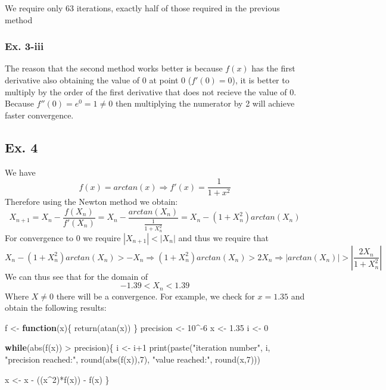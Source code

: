 \documentclass[
]{article}
\newenvironment{Shaded}{\begin{snugshade}}{\end{snugshade}}
\newcommand{\ControlFlowTok}[1]{\textcolor[rgb]{0.13,0.29,0.53}{\textbf{#1}}}
\newcommand{\DecValTok}[1]{\textcolor[rgb]{0.00,0.00,0.81}{#1}}
\newcommand{\FloatTok}[1]{\textcolor[rgb]{0.00,0.00,0.81}{#1}}
\newcommand{\FunctionTok}[1]{\textcolor[rgb]{0.00,0.00,0.00}{#1}}
\newcommand{\NormalTok}[1]{#1}
\newcommand{\OtherTok}[1]{\textcolor[rgb]{0.56,0.35,0.01}{#1}}
\newcommand{\SpecialCharTok}[1]{\textcolor[rgb]{0.00,0.00,0.00}{#1}}
\newcommand{\StringTok}[1]{\textcolor[rgb]{0.31,0.60,0.02}{#1}}
\begin{document}
We require only 63 iterations, exactly half of those required in the
previous method

\hypertarget{ex.-3-iii}{%
\subsubsection{Ex. 3-iii}\label{ex.-3-iii}}

The reason that the second method works better is because \(f(x)\) has
the first derivative also obtaining the value of 0 at point 0
(\(f'(0)=0\)), it is better to multiply by the order of the first
derivative that does not recieve the value of 0. Because
\(f''(0)=e^0=1\ne0\) then multiplying the numerator by 2 will achieve
faster convergence.

\hypertarget{ex.-4}{%
\subsection{Ex. 4}\label{ex.-4}}

We have \[
f(x) = arctan(x) \Rightarrow f'(x) = \frac{1}{1+x^2}
\] Therefore using the Newton method we obtain: \[
X_{n+1} = X_n - \frac{f(X_n)}{f'(X_n)}= X_n - \frac{arctan(X_n)}{\frac{1}{1+X_n^2}} = X_n- (1+X_n^2)arctan(X_n) 
\] For convergence to 0 we require \(|X_{n+1}|<|X_{n}|\) and thus we
require that \[
X_n- (1+X_n^2)arctan(X_n) > -X_n\Longrightarrow (1+X_n^2)arctan(X_n) > 2X_n \Longrightarrow |arctan(X_n)| > |\frac{2X_n}{1+X_n^2}|
\] We can thus see that for the domain of \[
-1.39<X_n<1.39
\] Where \(X\ne0\) there will be a convergence. For example, we check
for \(x=1.35\) and obtain the following results:

\begin{Shaded}
\begin{Highlighting}[]
\NormalTok{f }\OtherTok{\textless{}{-}} \ControlFlowTok{function}\NormalTok{(x)\{}
  \FunctionTok{return}\NormalTok{(}\FunctionTok{atan}\NormalTok{(x))}
\NormalTok{\}}
\NormalTok{precision }\OtherTok{\textless{}{-}} \DecValTok{10}\SpecialCharTok{\^{}{-}}\DecValTok{6}
\NormalTok{x }\OtherTok{\textless{}{-}} \FloatTok{1.35}
\NormalTok{i }\OtherTok{\textless{}{-}} \DecValTok{0}

\ControlFlowTok{while}\NormalTok{(}\FunctionTok{abs}\NormalTok{(}\FunctionTok{f}\NormalTok{(x)) }\SpecialCharTok{\textgreater{}}\NormalTok{ precision)\{}
\NormalTok{  i }\OtherTok{\textless{}{-}}\NormalTok{ i}\SpecialCharTok{+}\DecValTok{1}
  \FunctionTok{print}\NormalTok{(}\FunctionTok{paste}\NormalTok{(}\StringTok{"iteration number"}\NormalTok{, i, }\StringTok{"precision reached:"}\NormalTok{, }\FunctionTok{round}\NormalTok{(}\FunctionTok{abs}\NormalTok{(}\FunctionTok{f}\NormalTok{(x)),}\DecValTok{7}\NormalTok{), }\StringTok{"value reached:"}\NormalTok{, }\FunctionTok{round}\NormalTok{(x,}\DecValTok{7}\NormalTok{)))}
  

\NormalTok{  x }\OtherTok{\textless{}{-}}\NormalTok{ x }\SpecialCharTok{{-}}\NormalTok{ ((x}\SpecialCharTok{\^{}}\DecValTok{2}\NormalTok{)}\SpecialCharTok{*}\FunctionTok{f}\NormalTok{(x)) }\SpecialCharTok{{-}} \FunctionTok{f}\NormalTok{(x)}
\NormalTok{\}}
\end{Highlighting}
\end{Shaded}
\end{document}
